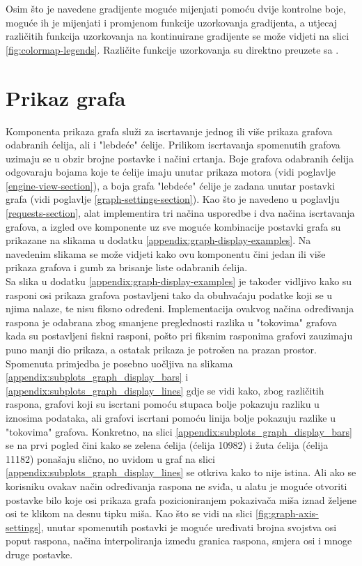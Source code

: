 \documentclass[times, utf8, diplomski]{fer}
\begin{document}
Osim što je navedene gradijente moguće mijenjati pomoću dvije kontrolne boje, moguće ih je mijenjati i promjenom funkcije uzorkovanja gradijenta, a utjecaj različitih funkcija uzorkovanja na kontinuirane gradijente se može vidjeti na slici \ref{fig:colormap-legends}. Različite funkcije uzorkovanja su direktno preuzete sa \citep{easing}.

\section{Prikaz grafa} \label{graph-view-section}

Komponenta prikaza grafa služi za iscrtavanje jednog ili više prikaza grafova odabranih ćelija, ali i "lebdeće" ćelije. Prilikom iscrtavanja spomenutih grafova uzimaju se u obzir brojne postavke i načini crtanja. Boje grafova odabranih ćelija odgovaraju bojama koje te ćelije imaju unutar prikaza motora (vidi poglavlje \ref{engine-view-section}), a boja grafa "lebdeće" ćelije je zadana unutar postavki grafa (vidi poglavlje \ref{graph-settings-section}). Kao što je navedeno u poglavlju \ref{requests-section}, alat implementira tri načina usporedbe i dva načina iscrtavanja grafova, a izgled ove komponente uz sve moguće kombinacije postavki grafa su prikazane na slikama u dodatku \ref{appendix:graph-display-examples}. Na navedenim slikama se može vidjeti kako ovu komponentu čini jedan ili više prikaza grafova i gumb za brisanje liste odabranih ćelija.\\

Sa slika u dodatku \ref{appendix:graph-display-examples} je također vidljivo kako su rasponi osi prikaza grafova postavljeni tako da obuhvaćaju podatke koji se u njima nalaze, te nisu fiksno određeni. Implementacija ovakvog načina određivanja raspona je odabrana zbog smanjene preglednosti razlika u "tokovima" grafova kada su postavljeni fiskni rasponi, pošto pri fiksnim rasponima grafovi zauzimaju puno manji dio prikaza, a ostatak prikaza je potrošen na prazan prostor. Spomenuta primjedba je posebno uočljiva na slikama \ref{appendix:subplots_graph_display_bars} i \ref{appendix:subplots_graph_display_lines} gdje se vidi kako, zbog različitih raspona, grafovi koji su iscrtani pomoću stupaca bolje pokazuju razliku u iznosima podataka, ali grafovi iscrtani pomoću linija bolje pokazuju razlike u "tokovima" grafova. Konkretno, na slici \ref{appendix:subplots_graph_display_bars} se na prvi pogled čini kako se zelena ćelija (ćelija 10982) i žuta ćelija (ćelija 11182) ponašaju slično, no uvidom u graf na slici \ref{appendix:subplots_graph_display_lines} se otkriva kako to nije istina. Ali ako se korisniku ovakav način određivanja raspona ne sviđa, u alatu je moguće otvoriti postavke bilo koje osi prikaza grafa pozicioniranjem pokazivača miša iznad željene osi te klikom na desnu tipku miša. Kao što se vidi na slici \ref{fig:graph-axis-settings}, unutar spomenutih postavki je moguće uređivati brojna svojstva osi poput raspona, načina interpoliranja između granica raspona, smjera osi i mnoge druge postavke.
\end{document}
